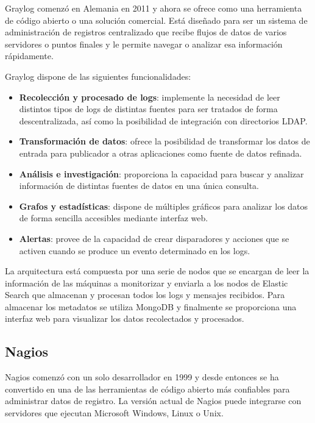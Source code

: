 Graylog comenzó en Alemania en 2011 y ahora se ofrece como una herramienta de código abierto o una solución comercial. Está diseñado para ser un sistema de administración de registros centralizado que recibe flujos de datos de varios servidores o puntos finales y le permite navegar o analizar esa información rápidamente.

Graylog dispone de las siguientes funcionalidades:

\begin{itemize}
\item \textbf{Recolección y procesado de logs}: implemente la necesidad de leer distintos tipos de logs de distintas fuentes para ser tratados de forma descentralizada, así como la posibilidad de integración con directorios LDAP.

\item \textbf{Transformación de datos}: ofrece la posibilidad de transformar los datos de entrada para publicador a otras aplicaciones como fuente de datos refinada.

\item \textbf{Análisis e investigación}: proporciona la capacidad para buscar y analizar información  de distintas fuentes de datos en una única consulta.

\item \textbf{Grafos y estadísticas}: dispone de múltiples gráficos para analizar los datos de forma sencilla accesibles mediante interfaz web.

\item \textbf{Alertas}: provee de la capacidad de crear disparadores y acciones que se activen cuando se produce un evento determinado en los logs. 
\end{itemize}

La arquitectura está compuesta por una serie de nodos que se encargan de leer la información de las máquinas a monitorizar y enviarla a los nodos de Elastic Search que almacenan y procesan todos los logs y mensajes recibidos. Para almacenar los metadatos se utiliza MongoDB y finalmente se proporciona una interfaz web para visualizar los datos recolectados y procesados.


\subsection{Nagios}

Nagios comenzó con un solo desarrollador en 1999 y desde entonces se ha convertido en una de las herramientas de código abierto más confiables para administrar datos de registro. La versión actual de Nagios puede integrarse con servidores que ejecutan Microsoft Windows, Linux o Unix.

